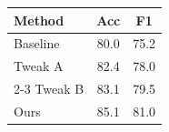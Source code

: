 \begin{tabular}{lcc}
\toprule
Method & Acc & F1 \\
\midrule
Baseline & 80.0 & 75.2 \\
\hline
Tweak A  & 82.4 & 78.0 \\
\cmidrule{2-3}
Tweak B  & 83.1 & 79.5 \\
\midrule
Ours     & 85.1 & 81.0 \\
\bottomrule
\end{tabular}
